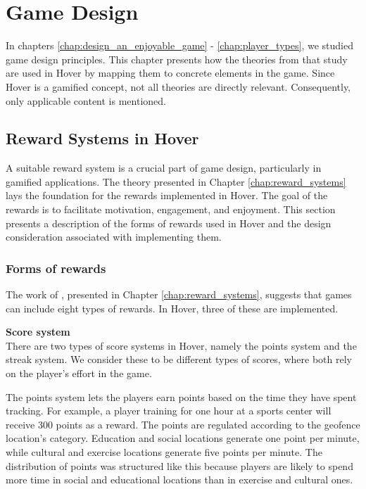 \section{Game Design}
\label{chap:game_design}

In chapters \ref{chap:design_an_enjoyable_game} - \ref{chap:player_types}, we studied game design principles. This chapter presents how the theories from that study are used in Hover by mapping them to concrete elements in the game. Since Hover is a gamified concept, not all theories are directly relevant. Consequently, only applicable content is mentioned.

\subsection{Reward Systems in Hover}
A suitable reward system is a crucial part of game design, particularly in gamified applications. The theory presented in Chapter \ref{chap:reward_systems} lays the foundation for the rewards implemented in Hover. The goal of the rewards is to facilitate motivation, engagement, and enjoyment. This section presents a description of the forms of rewards used in Hover and the design consideration associated with implementing them. 

\subsubsection{Forms of rewards}
The work of \citeauthor{wang_game_2011}, presented in Chapter \ref{chap:reward_systems}, suggests that games can include eight types of rewards. In Hover, three of these are implemented.

\textbf{Score system} \\
There are two types of score systems in Hover, namely the points system and the streak system. We consider these to be different types of scores, where both rely on the player’s effort in the game.

The points system lets the players earn points based on the time they have spent tracking. For example, a player training for one hour at a sports center will receive 300 points as a reward. The points are regulated according to the geofence location’s category. Education and social locations generate one point per minute, while cultural and exercise locations generate five points per minute. The distribution of points was structured like this because players are likely to spend more time in social and educational locations than in exercise and cultural ones. 

